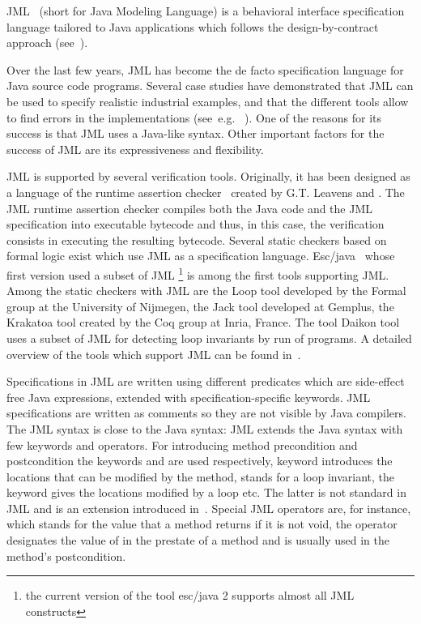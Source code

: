 \documentclass[a4paper]{llncs}
\begin{document}
JML~\cite{JMLRefMan} (short for Java Modeling Language) is a behavioral interface specification 
language tailored to Java applications which follows the design-by-contract approach (see~\cite{M97oos}).

Over the last few years, JML has become the de facto specification language for
 Java source code programs. Several case studies have demonstrated that JML can be used to specify realistic
industrial examples, and that the different tools allow to find errors
in the implementations (see~e.g. \/~\cite{BreunesseCHJ04}). One
of the reasons for its success is that JML uses a Java-like
syntax.  Other important factors for the success of JML are its expressiveness and
flexibility.

JML is supported by several verification tools.
 Originally, it has been designed as a language of the runtime assertion checker~\cite{jmlrac} created by G.T. Leavens and . 
The JML runtime assertion checker compiles both the Java code and the JML specification into executable bytecode and thus, 
in this case, the verification consists in executing the resulting bytecode. Several static checkers based 
on formal logic exist which use JML as a specification language. Esc/java~\cite{escjava}  whose first version used a subset 
 of JML \footnote{the current version of the tool esc/java 2  supports almost all JML constructs} is among the first tools supporting JML.
Among the static checkers with JML  are
the Loop tool developed by the Formal group at the University of Nijmegen,
the Jack tool developed at Gemplus, the Krakatoa tool created by the Coq group at Inria, France.
The tool Daikon \cite{ECG01DDL}  tool uses a subset of JML for detecting loop invariants by run of programs.
 A  detailed overview of the tools which support JML can  be found in~\cite{BurdyCCEKLLP05}.



    Specifications in JML are written using different predicates
    which are side-effect free Java expressions, extended with
    specification-specific keywords. JML specifications are written as comments so they are not
    visible by Java compilers. The JML syntax is close to the Java syntax: JML extends the Java
    syntax with few keywords and operators. 
    For introducing method precondition and postcondition the keywords  and  are used  
    respectively,   keyword introduces the locations that can be modified by the method, 
     stands for a loop invariant, the  keyword gives the 
    locations modified by a loop etc. The latter is not standard in JML and is an extension introduced in~\cite{BRL-JACK}.
    Special JML operators are, for instance,  which stands for the value that a method returns if it is not
    void, the  operator 
    designates the value of  in the prestate of a method and is usually
    used in the method's postcondition.
\end{document}
